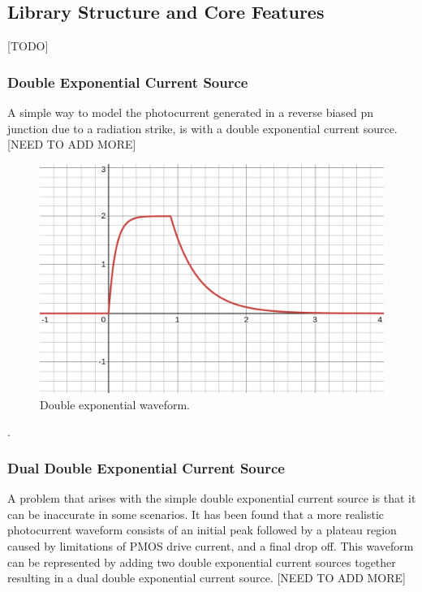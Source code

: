 \documentclass[conference]{IEEEtran}
\begin{document}
\subsection{Library Structure and Core Features}
[TODO]

\vspace{1em}
\subsubsection{Double Exponential Current Source}
A simple way to model the photocurrent generated in a reverse biased pn junction due to a radiation strike, is with a double exponential current source. [NEED TO ADD MORE]

\begin{figure}[htbp]
\centering
\includegraphics[width=0.9\linewidth]{double_exponential.png}
\caption{Double exponential waveform.}
\label{fig:double_exp}
\end{figure}

\cite{Pepper1990}.

\subsubsection{Dual Double Exponential Current Source}
A problem that arises with the simple double exponential current source is that it can be inaccurate in some scenarios. It has been found that a more realistic photocurrent waveform consists of an initial peak followed by a plateau region caused by limitations of PMOS drive current, and a final drop off. This waveform can be represented by adding two double exponential current sources together resulting in a dual double exponential current source. [NEED TO ADD MORE]
\end{document}
